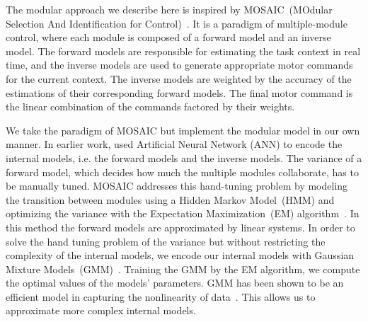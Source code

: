 

The modular approach we describe here is inspired by
MOSAIC~(MOdular Selection And
Identification for Control)~\citep{haruno2001mosaic}. It is a paradigm of multiple-module control,
where each module is composed of a forward model and an inverse
model. The forward models are responsible for estimating the task
context in real time, and the inverse models are used to generate
appropriate motor commands for the current context. The inverse models
are weighted by the accuracy of the estimations of their corresponding
forward models. The final motor command is the linear combination of
the commands factored by their weights.

We take the paradigm of MOSAIC but implement the modular model in our own manner. In earlier work, \citet{wolpert1998multiple} used
Artificial Neural Network (ANN) to encode the internal models,
i.e. the forward models and the inverse models. The variance of a
forward model, which decides how much the multiple modules
collaborate, has to be manually tuned. MOSAIC addresses this
hand-tuning problem by modeling the transition between modules using a Hidden Markov Model~(HMM) and optimizing the variance with the
Expectation Maximization~(EM) algorithm~\citep{haruno2001mosaic}. In
this method the forward models are approximated by linear systems. In order to solve the hand tuning problem of the variance but without restricting the complexity of the internal models, we encode our internal models with
Gaussian Mixture Models~(GMM)~\citep{cohn1996active}. Training the
GMM by the EM algorithm, we compute the optimal values of the models'
parameters. GMM has been shown to be an efficient model in capturing
the nonlinearity of
data~\citep{calinon2007incremental,sauser2011iterative,huang2013learning}.
This allows us to approximate more complex internal models.

